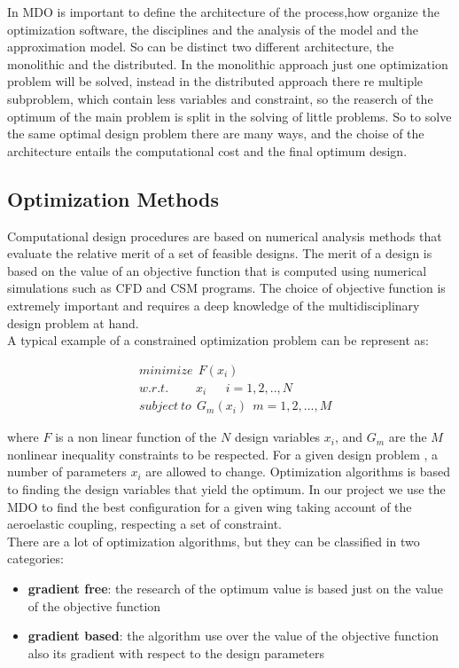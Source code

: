 In MDO is important to define the architecture of the process,how organize the optimization software, the disciplines and the analysis of the model and the approximation model. So can be distinct two different architecture, the monolithic and the distributed. In the monolithic approach just one optimization problem will be solved, instead in the distributed approach there re multiple subproblem, which contain less variables and constraint, so the reaserch of the optimum of the main problem is split in the solving of little problems. So to solve the same optimal design problem there are many ways, and the choise of the architecture entails the computational cost and the final optimum design.

\subsection{Optimization Methods}

Computational design procedures are based on numerical analysis methods that evaluate the relative merit of a set of feasible designs. The merit of a design is based on the value of an objective function that is computed using numerical simulations such as CFD and CSM programs. The choice of objective function is extremely important and requires a deep knowledge of the multidisciplinary design problem at hand. \cite{mart2}
\\
A typical example of a constrained optimization problem can be represent as:

\begin{align*}
	&minimize \ \ F(x_i)\\
	&w.r.t. \ \ \ \ \ \ \ \ \ \ x_i  \ \ \ \ \ \ \  i=1,2,..,N\\
	&subject\   to\ \  G_m(x_i) \ \ m=1,2,...,M
\end{align*}

where $F$ is a non linear function of the $N$ design variables $ x_i $, and $ G_m $ are the $ M $ nonlinear inequality constraints to be respected. For a given design problem , a number of parameters $ x_i $ are allowed to change. Optimization algorithms is based to finding the design variables that yield the optimum.
In our project we use the MDO to find the best configuration for a given wing taking account of the aeroelastic coupling, respecting a set of constraint.\\

There are a lot of optimization algorithms, but they can be classified in two categories:
\begin{itemize}
	\item \textbf{gradient free}: the research of the optimum value is based just on the value of the objective function
	\item \textbf{gradient based}: the algorithm use over the value of the objective function also its gradient with respect to the design parameters
\end{itemize}
